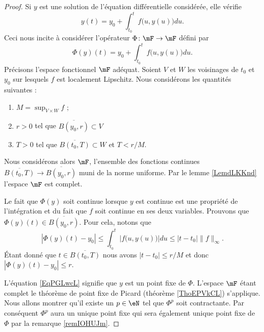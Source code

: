 \begin{proof}
    Si \( y\) est une solution de l'équation différentielle considérée, elle vérifie
    \begin{equation}        \label{EqPGLwcL}
        y(t)=y_0+\int_{t_0}^tf\big( u,y(u) \big)du.
    \end{equation}
    Ceci nous incite à considérer l'opérateur \( \Phi\colon \mF\to \mF\) défini par
    \begin{equation}
        \Phi(y)(t)=y_0+\int_{t_0}^tf\big( u,y(u) \big)du.
    \end{equation}
    Précisons l'espace fonctionnel \( \mF\) adéquat. Soient \( V\) et \( W\) les voisinages de \( t_0\) et \( y_0\) sur lesquels \( f\) est localement Lipschitz. Nous considérons les quantités suivantes :
    \begin{enumerate}
        \item
            \( M=\sup_{V\times W}f\) ;
        \item
            \( r>0\) tel que \( \overline{ B(y_0,r) }\subset V\)
        \item
            \( T>0\) tel que \( \overline{ B(t_0,T) }\subset W\) et \( T<r/M\).
    \end{enumerate}
    Nous considérons alors \( \mF\), l'ensemble des fonctions continues \( \overline{ B(t_0,T) }\to \overline{ B(y_0,r) }\) muni de la norme uniforme. Par le lemme \ref{LemdLKKnd} l'espace \( \mF\) est complet.

    Le fait que \( \Phi(y)\) soit continue lorsque \( y\) est continue est une propriété de l'intégration et du fait que \( f\) soit continue en ses deux variables. Prouvons que \( \Phi(y)(t)\in\overline{ B(y_0,r) }\). Pour cela, notons que
    \begin{equation}
        | \Phi(y)(t)-y_0 |\leq \int_{t_0}^t |f\big( u,y(u) \big)|du\leq | t-t_0 |\| f \|_{\infty}.
    \end{equation}
    Étant donné que \( t\in\overline{ B(t_0,T) }\) nous avons \( | t-t_0 |\leq r/M\) et donc \( | \Phi(y)(t)-y_0 |\leq r\).

    L'équation \eqref{EqPGLwcL} signifie que \( y\) est un point fixe de \( \Phi\). L'espace \( \mF\) étant complet le théorème de point fixe de Picard (théorème \ref{ThoEPVkCL}) s'applique. Nous allons montrer qu'il existe un \( p\in\eN\) tel que \( \Phi^p\) soit contractante. Par conséquent \( \Phi^p\) aura un unique point fixe qui sera également unique point fixe de \( \Phi\) par la remarque \ref{remIOHUJm}.
    

\end{proof}
